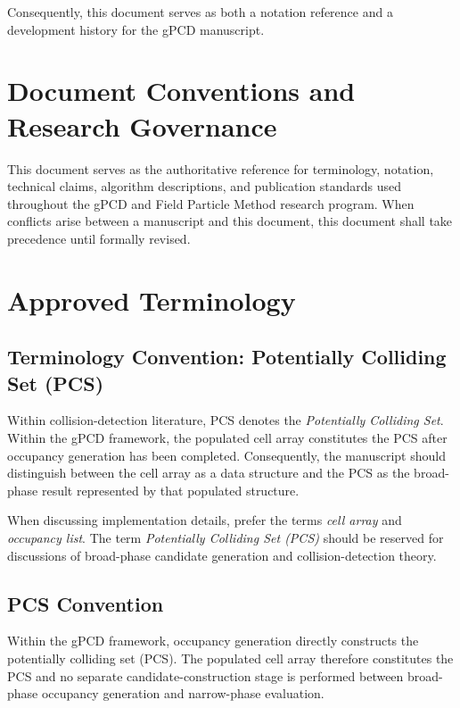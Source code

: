 Consequently, this document serves as both a notation reference and a
development history for the gPCD manuscript.

\section{Document Conventions and Research Governance}

This document serves as the authoritative reference for terminology,
notation, technical claims, algorithm descriptions, and publication
standards used throughout the gPCD and Field Particle Method research
program. When conflicts arise between a manuscript and this document,
this document shall take precedence until formally revised.


\section{Approved Terminology}

\subsection{Terminology Convention: Potentially Colliding Set (PCS)}

Within collision-detection literature, PCS denotes the
\emph{Potentially Colliding Set}. Within the gPCD framework, the
populated cell array constitutes the PCS after occupancy generation has
been completed. Consequently, the manuscript should distinguish between
the cell array as a data structure and the PCS as the broad-phase result
represented by that populated structure.

When discussing implementation details, prefer the terms
\emph{cell array} and \emph{occupancy list}. The term
\emph{Potentially Colliding Set (PCS)} should be reserved for
discussions of broad-phase candidate generation and collision-detection
theory.

\subsection*{PCS Convention}

Within the gPCD framework, occupancy generation directly constructs the
potentially colliding set (PCS). The populated cell array therefore
constitutes the PCS and no separate candidate-construction stage is
performed between broad-phase occupancy generation and narrow-phase
evaluation.

